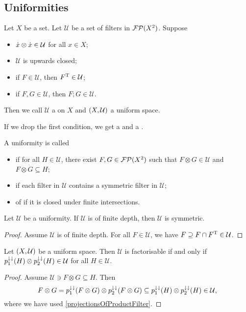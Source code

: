 \subsection{Uniformities}
\begin{definition}
Let $X$ be a set. Let $\mathcal{U}$ be a set of filters in $\operatorname{\mathcal{FP}}(X^2)$. Suppose
\begin{itemize}
\item $\dot{x}\otimes \dot{x} \in \mathcal{U}$ for all $x\in X$;
\item $\mathcal{U}$ is upwards closed;
\item if $F\in \mathcal{U}$, then $F^{\mathrm{T}}\in\mathcal{U}$;
\item if $F, G\in \mathcal{U}$, then $F;G\in\mathcal{U}$.
\end{itemize}
Then we call $\mathcal{U}$ a  on $X$ and $\left( X,\mathcal{U} \right)$ a uniform space.

If we drop the first condition, we get a  and a .

A uniformity is called 
\begin{itemize}
\item {} if for all $H\in\mathcal{U}$, there exist $F,G\in \operatorname{\mathcal{FP}}(X^2)$ such that $F\otimes G \in\mathcal{U}$ and $F\otimes G\subseteq H$;
\item {} if each filter in $\mathcal{U}$ contains a symmetric filter in $\mathcal{U}$;
\item of  if it is closed under finite intersections.
\end{itemize}
\end{definition}

\begin{lemma}
Let $\mathcal{U}$ be a uniformity. If $\mathcal{U}$ is of finite depth, then $\mathcal{U}$ is symmetric.
\end{lemma}
\begin{proof}
Assume $\mathcal{U}$ is of finite depth. For all $F\in\mathcal{U}$, we have $F\supseteq F\cap F^{\mathrm{T}} \in \mathcal{U}$.
\end{proof}

\begin{lemma}
Let $\left( X,\mathcal{U} \right)$ be a uniform space. Then $\mathcal{U}$ is factorisable \textup{if and only if} $p_1^{\downarrow\downarrow}(H)\otimes p_2^{\downarrow\downarrow}(H) \in \mathcal{U}$ for all $H\in\mathcal{U}$.
\end{lemma}
\begin{proof}
Assume $\mathcal{U} \ni F\otimes G \subseteq H$. Then
\[ F\otimes G = p_1^{\downarrow\downarrow}(F\otimes G)\otimes p_2^{\downarrow\downarrow}(F\otimes G) \subseteq p_1^{\downarrow\downarrow}(H)\otimes p_2^{\downarrow\downarrow}(H) \in \mathcal{U}, \]
where we have used \ref{projectionsOfProductFilter}.
\end{proof}

